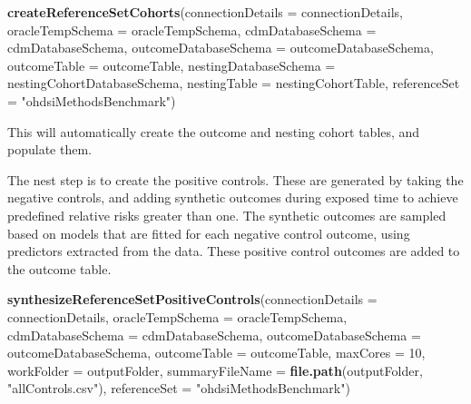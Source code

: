 \documentclass[]{article}
\newenvironment{Shaded}{\begin{snugshade}}{\end{snugshade}}
\newcommand{\DataTypeTok}[1]{\textcolor[rgb]{0.13,0.29,0.53}{#1}}
\newcommand{\DecValTok}[1]{\textcolor[rgb]{0.00,0.00,0.81}{#1}}
\newcommand{\KeywordTok}[1]{\textcolor[rgb]{0.13,0.29,0.53}{\textbf{#1}}}
\newcommand{\NormalTok}[1]{#1}
\newcommand{\StringTok}[1]{\textcolor[rgb]{0.31,0.60,0.02}{#1}}
\begin{document}
\begin{Shaded}
\begin{Highlighting}[]
\KeywordTok{createReferenceSetCohorts}\NormalTok{(}\DataTypeTok{connectionDetails =}\NormalTok{ connectionDetails,}
                          \DataTypeTok{oracleTempSchema =}\NormalTok{ oracleTempSchema,}
                          \DataTypeTok{cdmDatabaseSchema =}\NormalTok{ cdmDatabaseSchema,}
                          \DataTypeTok{outcomeDatabaseSchema =}\NormalTok{ outcomeDatabaseSchema,}
                          \DataTypeTok{outcomeTable =}\NormalTok{ outcomeTable,}
                          \DataTypeTok{nestingDatabaseSchema =}\NormalTok{ nestingCohortDatabaseSchema,}
                          \DataTypeTok{nestingTable =}\NormalTok{ nestingCohortTable,}
                          \DataTypeTok{referenceSet =} \StringTok{"ohdsiMethodsBenchmark"}\NormalTok{)}
\end{Highlighting}
\end{Shaded}

This will automatically create the outcome and nesting cohort tables,
and populate them.

The nest step is to create the positive controls. These are generated by
taking the negative controls, and adding synthetic outcomes during
exposed time to achieve predefined relative risks greater than one. The
synthetic outcomes are sampled based on models that are fitted for each
negative control outcome, using predictors extracted from the data.
These positive control outcomes are added to the outcome table.

\begin{Shaded}
\begin{Highlighting}[]
\KeywordTok{synthesizeReferenceSetPositiveControls}\NormalTok{(}\DataTypeTok{connectionDetails =}\NormalTok{ connectionDetails,}
                                       \DataTypeTok{oracleTempSchema =}\NormalTok{ oracleTempSchema,}
                                       \DataTypeTok{cdmDatabaseSchema =}\NormalTok{ cdmDatabaseSchema,}
                                       \DataTypeTok{outcomeDatabaseSchema =}\NormalTok{ outcomeDatabaseSchema,}
                                       \DataTypeTok{outcomeTable =}\NormalTok{ outcomeTable,}
                                       \DataTypeTok{maxCores =} \DecValTok{10}\NormalTok{,}
                                       \DataTypeTok{workFolder =}\NormalTok{ outputFolder,}
                                       \DataTypeTok{summaryFileName =} \KeywordTok{file.path}\NormalTok{(outputFolder, }
                                                                   \StringTok{"allControls.csv"}\NormalTok{),}
                                       \DataTypeTok{referenceSet =} \StringTok{"ohdsiMethodsBenchmark"}\NormalTok{)}
\end{Highlighting}
\end{Shaded}
\end{document}

